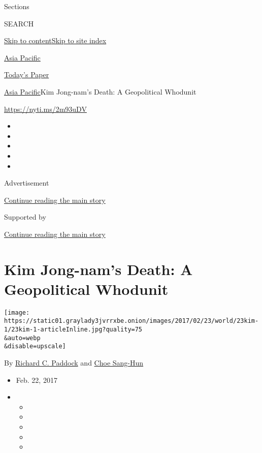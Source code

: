 Sections

SEARCH

\protect\hyperlink{site-content}{Skip to
content}\protect\hyperlink{site-index}{Skip to site index}

\href{https://www.nytimes3xbfgragh.onion/section/world/asia}{Asia
Pacific}

\href{https://myaccount.nytimes3xbfgragh.onion/auth/login?response_type=cookie\&client_id=vi}{}

\href{https://www.nytimes3xbfgragh.onion/section/todayspaper}{Today's
Paper}

\href{/section/world/asia}{Asia Pacific}\textbar{}Kim Jong-nam's Death:
A Geopolitical Whodunit

\url{https://nyti.ms/2m93uDV}

\begin{itemize}
\item
\item
\item
\item
\item
\end{itemize}

Advertisement

\protect\hyperlink{after-top}{Continue reading the main story}

Supported by

\protect\hyperlink{after-sponsor}{Continue reading the main story}

\hypertarget{kim-jong-nams-death-a-geopolitical-whodunit}{%
\section{Kim Jong-nam's Death: A Geopolitical
Whodunit}\label{kim-jong-nams-death-a-geopolitical-whodunit}}

\texttt{[image: https://static01.graylady3jvrrxbe.onion/images/2017/02/23/world/23kim-1/23kim-1-articleInline.jpg?quality=75\\\&auto=webp\\\&disable=upscale]}

By
\href{https://www.nytimes3xbfgragh.onion/by/richard-c-paddock}{Richard
C. Paddock} and
\href{http://www.nytimes3xbfgragh.onion/by/choe-sang-hun}{Choe Sang-Hun}

\begin{itemize}
\item
  Feb. 22, 2017
\item
  \begin{itemize}
  \item
  \item
  \item
  \item
  \item
  \end{itemize}
\end{itemize}

